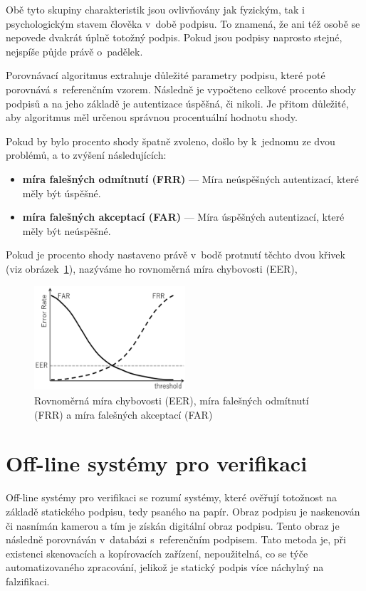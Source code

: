 Obě tyto skupiny charakteristik jsou ovlivňovány jak fyzickým, tak i psychologickým stavem člověka v~době podpisu.
To znamená, že ani též osobě se nepovede dvakrát úplně totožný podpis.
Pokud jsou podpisy naprosto stejné, nejspíše půjde právě o~padělek.

Porovnávací algoritmus extrahuje důležité parametry podpisu, které poté porovnává s~referenčním vzorem. 
Následně je vypočteno celkové procento shody podpisů a na jeho základě je autentizace úspěšná, či nikoli.
Je přitom důležité, aby algoritmus měl určenou správnou procentuální hodnotu shody. 

Pokud by bylo procento shody špatně zvoleno, došlo by k~jednomu ze dvou problémů, a to zvýšení následujících:
\begin{itemize}
  \item \textbf{míra falešných odmítnutí (FRR)} --- Míra neúspěšných autentizací, které měly být úspěšné.
  \item \textbf{míra falešných akceptací (FAR)} --- Míra úspěšných autentizací, které měly být neúspěšné.
\end{itemize}

Pokud je procento shody nastaveno právě v~bodě protnutí těchto dvou křivek (viz obrázek~\ref{fig:FAR_FRR}), nazýváme ho rovnoměrná míra chybovosti (EER), 

\begin{figure}[H]
  \centering
  \includegraphics[width=0.5\textwidth]{obrazky-figures/FAR_FRR.png}
  \caption{Rovnoměrná míra chybovosti (EER), míra falešných odmítnutí (FRR) a míra falešných akceptací (FAR)~\cite{cursorinsight_frr_fa}} %
  \label{fig:FAR_FRR}
\end{figure}


\section{Off-line systémy pro verifikaci}
Off-line systémy pro verifikaci se rozumí systémy, které ověřují totožnost na základě statického podpisu, tedy psaného na papír. %
Obraz podpisu je naskenován či nasnímán kamerou a tím je získán digitální obraz podpisu.                                         %
Tento obraz je následně porovnáván v~databázi s~referenčním podpisem.                                                            %
Tato metoda je, při existenci skenovacích a kopírovacích zařízení, nepoužitelná, co se týče automatizovaného zpracování, jelikož je statický podpis více náchylný na falzifikaci.~\cite{RakRoman2008}%

